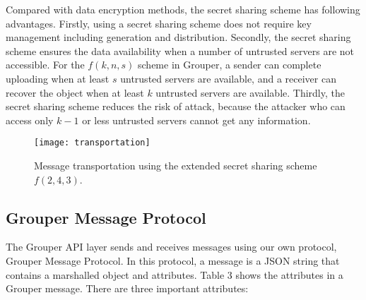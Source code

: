 Compared with data encryption methods, the secret sharing scheme has following advantages.
Firstly, using a secret sharing scheme does not require key management including generation and distribution.
Secondly, the secret sharing scheme ensures the data availability when a number of untrusted servers are not accessible.
For the $f(k, n, s)$ scheme in Grouper, a sender can complete uploading when at least $s$ untrusted servers are available, and a receiver can recover the object when at least $k$ untrusted servers are available.
Thirdly, the secret sharing scheme reduces the risk of attack, because the attacker who can access only $k-1$ or less untrusted servers cannot get any information.

\begin{figure}[t]
	\centering
	\texttt{[image: transportation]}
	\caption{Message transportation using the extended secret sharing scheme  $f(2, 4, 3)$.}
\end{figure}

\subsection{Grouper Message Protocol}

The Grouper API layer sends and receives messages using our own protocol, Grouper Message Protocol.
In this protocol, a message is a JSON string that contains a marshalled object and attributes.
Table 3 shows the attributes in a Grouper message.
There are three important attributes:

